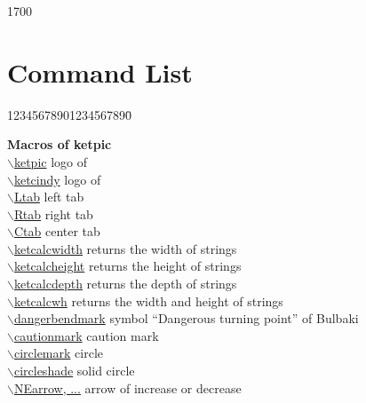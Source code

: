 \documentclass[papersize,a4paper,12pt]{article}
\newcommand{\bs}{$\backslash$}
\begin{document}
\par

\begin{layer}{170}{0}
\end{layer}

\newpage

\hypertarget{functionlist}{}
\section{Command List}

\begin{tabbing}
12345678901234567890\=\kill

{\bf Macros of ketpic} \> \\
\hyperlink{ketpic}{\bs ketpic} \> logo of \ketpic\\
\hyperlink{ketcindy}{\bs ketcindy} \> logo of \ketcindy\\
\hyperlink{tab}{\bs Ltab} \> left tab\\
\hyperlink{tab}{\bs Rtab} \> right tab\\
\hyperlink{tab}{\bs Ctab} \> center tab\\
\hyperlink{ketcalc}{\bs ketcalcwidth} \> returns the width of strings\\
\hyperlink{ketcalc}{\bs ketcalcheight} \> returns the height of strings\\
\hyperlink{ketcalc}{\bs ketcalcdepth} \> returns the depth of strings\\
\hyperlink{ketcalcwh}{\bs ketcalcwh} \> returns the width and height of strings\\
\hyperlink{dangerbendmark}{\bs dangerbendmark} \> symbol ``Dangerous turning point'' of Bulbaki\\
\hyperlink{cautionmark}{\bs cautionmark} \> caution mark\\
\hyperlink{circlemark}{\bs circlemark} \> circle\\
\hyperlink{circleshade}{\bs circleshade} \> solid circle\\
\hyperlink{arrow of i or d}{\bs NEarrow, ...} \> arrow of increase or decrease\\


\end{tabbing}
\end{document}
